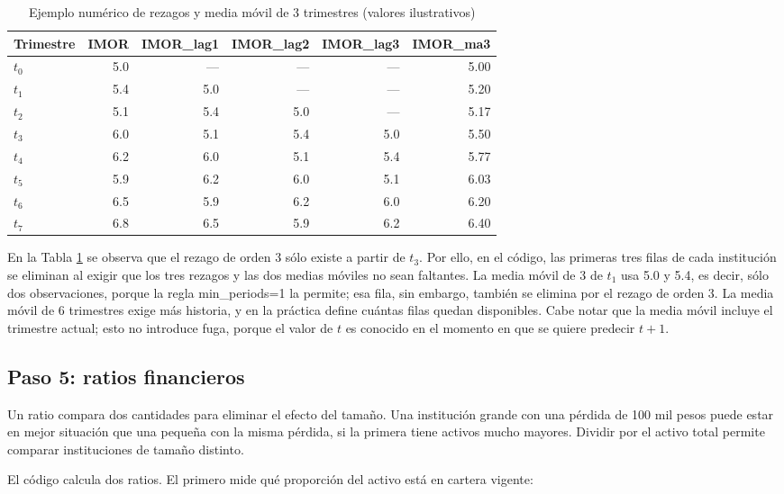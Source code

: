 \begin{table}[H]
\centering
\caption{Ejemplo numérico de rezagos y media móvil de 3 trimestres (valores ilustrativos)}
\label{tab:met_ejemplo_rezagos}
\small
\begin{tabularx}{\textwidth}{Xrrrrr}
\toprule
\textbf{Trimestre} & \textbf{IMOR} & \textbf{IMOR\_lag1} & \textbf{IMOR\_lag2} & \textbf{IMOR\_lag3} & \textbf{IMOR\_ma3} \\
\midrule
$t_0$ & 5.0 & --- & --- & --- & 5.00 \\
$t_1$ & 5.4 & 5.0 & --- & --- & 5.20 \\
$t_2$ & 5.1 & 5.4 & 5.0 & --- & 5.17 \\
$t_3$ & 6.0 & 5.1 & 5.4 & 5.0 & 5.50 \\
$t_4$ & 6.2 & 6.0 & 5.1 & 5.4 & 5.77 \\
$t_5$ & 5.9 & 6.2 & 6.0 & 5.1 & 6.03 \\
$t_6$ & 6.5 & 5.9 & 6.2 & 6.0 & 6.20 \\
$t_7$ & 6.8 & 6.5 & 5.9 & 6.2 & 6.40 \\
\bottomrule
\end{tabularx}
\end{table}

En la Tabla \ref{tab:met_ejemplo_rezagos} se observa que el rezago de orden 3 sólo existe a partir de $t_3$. Por ello, en el código, las primeras tres filas de cada institución se eliminan al exigir que los tres rezagos y las dos medias móviles no sean faltantes. La media móvil de 3 de $t_1$ usa 5.0 y 5.4, es decir, sólo dos observaciones, porque la regla min\_periods=1 la permite; esa fila, sin embargo, también se elimina por el rezago de orden 3. La media móvil de 6 trimestres exige más historia, y en la práctica define cuántas filas quedan disponibles. Cabe notar que la media móvil incluye el trimestre actual; esto no introduce fuga, porque el valor de $t$ es conocido en el momento en que se quiere predecir $t+1$.

\subsection{Paso 5: ratios financieros}
Un ratio compara dos cantidades para eliminar el efecto del tamaño. Una institución grande con una pérdida de 100 mil pesos puede estar en mejor situación que una pequeña con la misma pérdida, si la primera tiene activos mucho mayores. Dividir por el activo total permite comparar instituciones de tamaño distinto.

El código calcula dos ratios. El primero mide qué proporción del activo está en cartera vigente:

